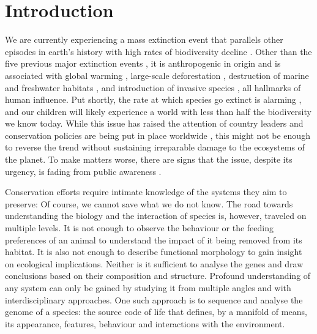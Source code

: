 \chapter{Introduction}
\label{introduction}

We are currently experiencing a mass extinction event that parallels
other episodes in earth's history with high rates of biodiversity
decline \citep{Pimm1995, Dirzo2003, Schipper2008, Barnosky2011,
Dirzo2014}. Other than the five previous major extinction events
\citep{Kolbert2014}, it is anthropogenic in origin \citep{Leakey1996,
Ceballos2015} and is associated with global warming \citep{Cook2016,
Wuebbles2017}, large-scale deforestation \citep{Wright2005}, destruction
of marine and freshwater habitats \citep{Burkhead2012}, and introduction
of invasive species \citep{Mooney2001}, all hallmarks of human
influence. Put shortly, the rate at which species go extinct is alarming
\citep{Newbold2016, Ceballos2017, Hallmann2017}, and our children will
likely experience a world with less than half the biodiversity we know
today. While this issue has raised the attention of country leaders and
conservation policies are being put in place worldwide
\citep{Puntaru2017}, this might not be enough to reverse the trend
without sustaining irreparable damage to the ecosystems of the planet.
To make matters worse, there are signs that the issue, despite its
urgency, is fading from public awareness \citep{Kusmanoff2017}. 

Conservation efforts require intimate knowledge of the systems they aim
to preserve: Of course, we cannot save what we do not know. The road
towards understanding the biology and the interaction of species is,
however, traveled on multiple levels. It is not enough to observe the
behaviour or the feeding preferences of an animal to understand the
impact of it being removed from its habitat. It is also not enough to
describe functional morphology to gain insight on ecological
implications. Neither is it sufficient to analyse the genes and draw
conclusions based on their composition and structure. Profound
understanding of any system can only be gained by studying it from
multiple angles and with interdisciplinary approaches. One such approach
is to sequence and analyse the genome of a species: the source code of
life that defines, by a manifold of means, its appearance, features,
behaviour and interactions with the environment.

